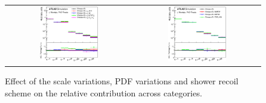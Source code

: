 \begin{figure}[!t]
\begin{center}
\begin{tabular}{cc}
\includegraphics[width=0.48\textwidth]{Modeling/Figures/scales_realHFbb_extHFtype_norm.eps} &
\includegraphics[width=0.48\textwidth]{Modeling/Figures/other_realHFbb_extHFtype_norm.eps} \\
\end{tabular}
\caption{Effect of the scale variations, PDF variations and shower recoil scheme on the relative contribution across categories.}
\label{fig:scales_other_extHFtype}
\end{center}
\end{figure}

